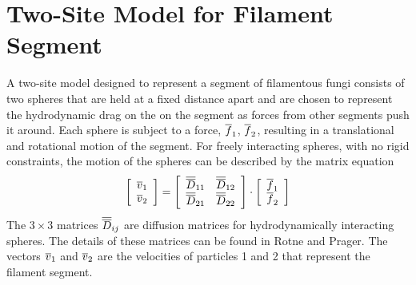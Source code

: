 \documentclass[12pt]{article}
\begin{document}

\section{Two-Site Model for Filament Segment}
A two-site model designed to represent a segment of filamentous fungi consists
of two spheres that are held at a fixed distance apart and are chosen to represent
the hydrodynamic drag on the on the segment as forces from other segments push
it around. Each sphere is subject to a force, $\overline{f}_1$, $\overline{f}_2$, resulting in
a translational and rotational motion of the segment. For freely interacting
spheres, with no rigid constraints, the motion of the spheres can be described
by the matrix equation
\[
\left[\begin{array}{c}\overline{v}_1 \\ \overline{v}_2 \end{array}\right] =
\left[\begin{array}{cc} \overline{\overline{D}}_{11} & \overline{\overline{D}}_{12} \\
\overline{\overline{D}}_{21} & \overline{\overline{D}}_{22} \end{array}\right]
\cdot\left[\begin{array}{c} \overline{f}_1 \\ \overline{f}_2 \end{array}\right]
\]
The $3\times 3$ matrices $\overline{\overline{D}}_{ij}$ are diffusion matrices for hydrodynamically
interacting spheres. The details of these matrices can be found in Rotne and
Prager\cite{RP}. The vectors $\overline{v}_1$ and $\overline{v}_2$ are the
velocities of particles 1 and 2 that represent the filament segment.
\end{document}
